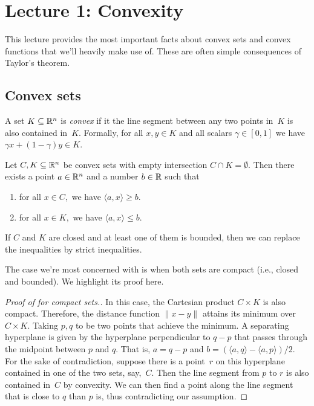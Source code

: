\section{Lecture 1: Convexity}

This lecture provides the most important facts about convex sets and convex
functions that we'll heavily make use of. These are often simple consequences of
Taylor's theorem.

\subsection{Convex sets}

\begin{definition}
A set $K\subseteq\mathbb{R}^n$ is \emph{convex} if it the line segment between any two points in~$K$ is also contained in~$K.$ Formally, for all $x,y\in K$ and all scalars $\gamma\in[0,1]$ we have $\gamma x+(1-\gamma)y\in K.$
\end{definition}

\begin{theorem}
Let $C, K\subseteq\mathbb{R}^n$ be convex sets with empty intersection $C\cap K=\emptyset.$ Then there exists a point $a\in\mathbb{R}^n$ and a number $b\in\mathbb{R}$ such that
\begin{enumerate}
\item for all $x\in C,$ we have $\langle a, x\rangle \ge b.$
\item for all $x\in K,$ we have $\langle a, x\rangle \le b.$
\end{enumerate}
If $C$ and $K$ are closed and at least one of them is bounded, then we can replace the inequalities by strict inequalities.
\end{theorem}
The case we're most concerned with is when both sets are compact (i.e., closed and bounded). We highlight its proof here.
\begin{proof}[Proof of  for compact sets.]
In this case, the Cartesian product $C\times K$ is also compact. Therefore, the
distance function $\|x-y\|$ attains its minimum over $C\times K.$ Taking $p, q$
to be two points that achieve the minimum. A separating hyperplane is given by
the hyperplane perpendicular to $q-p$ that passes through the midpoint between
$p$ and $q.$ That is, $a=q-p$ and $b=(\langle a, q\rangle - \langle a,
p\rangle)/2.$ For the sake of contradiction, suppose there is a point~$r$ on
this hyperplane contained in one of the two sets, say,~$C.$ Then the line
segment from $p$ to $r$ is also contained in~$C$ by convexity. We can then find
a point along the line segment that is close to $q$ than $p$ is, thus
contradicting our assumption.
\end{proof}

